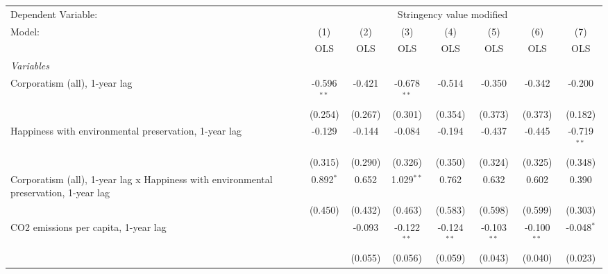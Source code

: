 
\begingroup
\centering
\begin{tabular}{lccccccc}
   \toprule
   Dependent Variable: & \multicolumn{7}{c}{Stringency value modified}\\
   Model:                                                                                & (1)           & (2)     & (3)           & (4)           & (5)           & (6)           & (7)\\  
                                                                                         &  OLS          & OLS     & OLS           & OLS           & OLS           & OLS           & OLS\\  
   \midrule
   \emph{Variables}\\
   Corporatism (all), 1-year lag                                                         & -0.596$^{**}$ & -0.421  & -0.678$^{**}$ & -0.514        & -0.350        & -0.342        & -0.200\\   
                                                                                         & (0.254)       & (0.267) & (0.301)       & (0.354)       & (0.373)       & (0.373)       & (0.182)\\   
   Happiness with environmental preservation, 1-year lag                                 & -0.129        & -0.144  & -0.084        & -0.194        & -0.437        & -0.445        & -0.719$^{**}$\\   
                                                                                         & (0.315)       & (0.290) & (0.326)       & (0.350)       & (0.324)       & (0.325)       & (0.348)\\   
   Corporatism (all), 1-year lag x Happiness with environmental preservation, 1-year lag & 0.892$^{*}$   & 0.652   & 1.029$^{**}$  & 0.762         & 0.632         & 0.602         & 0.390\\   
                                                                                         & (0.450)       & (0.432) & (0.463)       & (0.583)       & (0.598)       & (0.599)       & (0.303)\\   
   CO2 emissions per capita, 1-year lag                                                  &               & -0.093  & -0.122$^{**}$ & -0.124$^{**}$ & -0.103$^{**}$ & -0.100$^{**}$ & -0.048$^{*}$\\   
                                                                                         &               & (0.055) & (0.056)       & (0.059)       & (0.043)       & (0.040)       & (0.023)\\   

\end{tabular}
